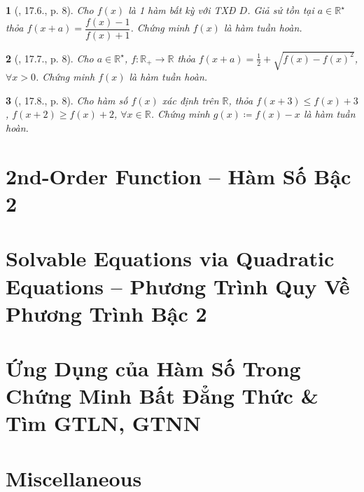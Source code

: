 \documentclass{article}
\newtheorem{baitoan}{}
\begin{document}
\begin{baitoan}[\cite{Hai_Hung_Thu_Tung_ncpt_Toan_10_tap_2}, 17.6., p. 8]
	Cho $f(x)$ là 1 hàm bất kỳ với {\rm TXĐ} $D$. Giả sử tồn tại $a\in\mathbb{R}^\star$ thỏa $f(x + a) = \dfrac{f(x) - 1}{f(x) + 1}$. Chứng minh $f(x)$ là hàm tuần hoàn.
\end{baitoan}

\begin{baitoan}[\cite{Hai_Hung_Thu_Tung_ncpt_Toan_10_tap_2}, 17.7., p. 8]
	Cho $a\in\mathbb{R}^\star$, $f:\mathbb{R}_+\to\mathbb{R}$ thỏa $f(x + a) = \frac{1}{2} + \sqrt{f(x) - f(x)^2}$, $\forall x > 0$. Chứng minh $f(x)$ là hàm tuần hoàn.
\end{baitoan}

\begin{baitoan}[\cite{Hai_Hung_Thu_Tung_ncpt_Toan_10_tap_2}, 17.8., p. 8]
	Cho hàm số $f(x)$ xác định trên $\mathbb{R}$, thỏa $f(x + 3)\le f(x) + 3$, $f(x + 2)\ge f(x) + 2$, $\forall x\in\mathbb{R}$. Chứng minh $g(x)\coloneqq f(x) - x$ là hàm tuần hoàn.
\end{baitoan}


\section{2nd-Order Function -- Hàm Số Bậc 2}


\section{Solvable Equations via Quadratic Equations -- Phương Trình Quy Về Phương Trình Bậc 2}


\section{Ứng Dụng của Hàm Số Trong Chứng Minh Bất Đẳng Thức \& Tìm GTLN, GTNN}


\section{Miscellaneous}


\printbibliography[heading=bibintoc]
	
\end{document}
